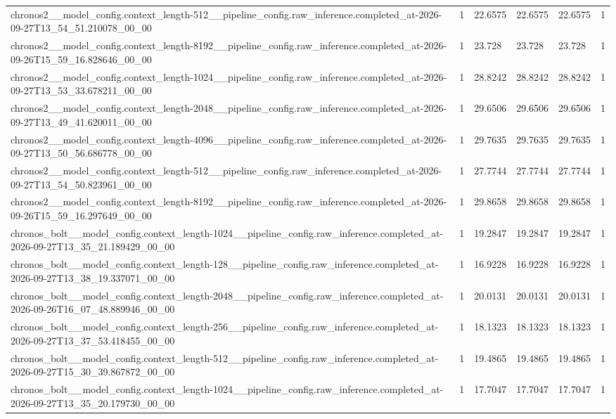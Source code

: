 \begin{tabular}{llllll}
chronos2\_\_model\_config.context\_length-512\_\_pipeline\_config.raw\_inference.completed\_at-2026-09-27T13\_54\_51.210078\_00\_00 & 1 & 22.6575 & 22.6575 & 22.6575 & 1 \\
chronos2\_\_model\_config.context\_length-8192\_\_pipeline\_config.raw\_inference.completed\_at-2026-09-26T15\_59\_16.828646\_00\_00 & 1 & 23.728 & 23.728 & 23.728 & 1 \\
chronos2\_\_model\_config.context\_length-1024\_\_pipeline\_config.raw\_inference.completed\_at-2026-09-27T13\_53\_33.678211\_00\_00 & 1 & 28.8242 & 28.8242 & 28.8242 & 1 \\
chronos2\_\_model\_config.context\_length-2048\_\_pipeline\_config.raw\_inference.completed\_at-2026-09-27T13\_49\_41.620011\_00\_00 & 1 & 29.6506 & 29.6506 & 29.6506 & 1 \\
chronos2\_\_model\_config.context\_length-4096\_\_pipeline\_config.raw\_inference.completed\_at-2026-09-27T13\_50\_56.686778\_00\_00 & 1 & 29.7635 & 29.7635 & 29.7635 & 1 \\
chronos2\_\_model\_config.context\_length-512\_\_pipeline\_config.raw\_inference.completed\_at-2026-09-27T13\_54\_50.823961\_00\_00 & 1 & 27.7744 & 27.7744 & 27.7744 & 1 \\
chronos2\_\_model\_config.context\_length-8192\_\_pipeline\_config.raw\_inference.completed\_at-2026-09-26T15\_59\_16.297649\_00\_00 & 1 & 29.8658 & 29.8658 & 29.8658 & 1 \\
chronos\_bolt\_\_model\_config.context\_length-1024\_\_pipeline\_config.raw\_inference.completed\_at-2026-09-27T13\_35\_21.189429\_00\_00 & 1 & 19.2847 & 19.2847 & 19.2847 & 1 \\
chronos\_bolt\_\_model\_config.context\_length-128\_\_pipeline\_config.raw\_inference.completed\_at-2026-09-27T13\_38\_19.337071\_00\_00 & 1 & 16.9228 & 16.9228 & 16.9228 & 1 \\
chronos\_bolt\_\_model\_config.context\_length-2048\_\_pipeline\_config.raw\_inference.completed\_at-2026-09-26T16\_07\_48.889946\_00\_00 & 1 & 20.0131 & 20.0131 & 20.0131 & 1 \\
chronos\_bolt\_\_model\_config.context\_length-256\_\_pipeline\_config.raw\_inference.completed\_at-2026-09-27T13\_37\_53.418455\_00\_00 & 1 & 18.1323 & 18.1323 & 18.1323 & 1 \\
chronos\_bolt\_\_model\_config.context\_length-512\_\_pipeline\_config.raw\_inference.completed\_at-2026-09-27T15\_30\_39.867872\_00\_00 & 1 & 19.4865 & 19.4865 & 19.4865 & 1 \\
chronos\_bolt\_\_model\_config.context\_length-1024\_\_pipeline\_config.raw\_inference.completed\_at-2026-09-27T13\_35\_20.179730\_00\_00 & 1 & 17.7047 & 17.7047 & 17.7047 & 1 \\

\end{tabular}
